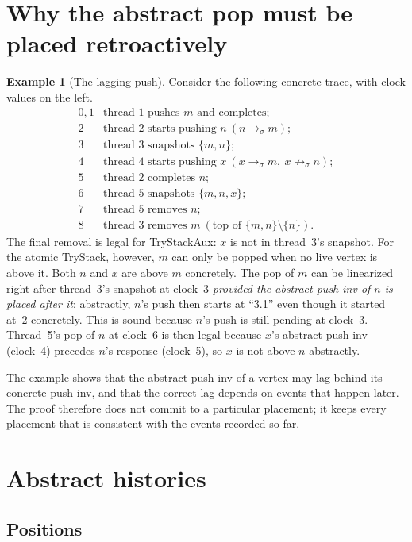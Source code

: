 \documentclass[11pt]{article}
\theoremstyle{definition}
\newtheorem{example}[lemma]{Example}
\theoremstyle{remark}
\newcommand{\conc}{\sigma}
\begin{document}
\section{Why the abstract pop must be placed retroactively}

\begin{example}[The lagging push]\label{ex:f1}
Consider the following concrete trace, with clock values on the left.
\[
\begin{array}{cl}
0,1 & \text{thread 1 pushes } m \text{ and completes};\\
2 & \text{thread 2 starts pushing } n\ (n\to_\conc m);\\
3 & \text{thread 3 snapshots } \{m,n\};\\
4 & \text{thread 4 starts pushing } x\ (x\to_\conc m,\ x\not\to_\conc n);\\
5 & \text{thread 2 completes } n;\\
6 & \text{thread 5 snapshots } \{m,n,x\};\\
7 & \text{thread 5 removes } n;\\
8 & \text{thread 3 removes } m\ (\text{top of }\{m,n\}\setminus\{n\}).
\end{array}
\]
The final removal is legal for TryStackAux: \(x\) is not in thread~3's
snapshot.  For the atomic TryStack, however, \(m\) can only be popped when
no live vertex is above it.  Both \(n\) and \(x\) are above \(m\)
concretely.  The pop of \(m\) can be linearized right after thread~3's
snapshot at clock~3 \emph{provided the abstract push-inv of \(n\) is placed
after it}: abstractly, \(n\)'s push then starts at ``3.1'' even though it
started at~2 concretely.  This is sound because \(n\)'s push is still pending
at clock~3.  Thread~5's pop of \(n\) at clock~6 is then legal because
\(x\)'s abstract push-inv (clock~4) precedes \(n\)'s response (clock~5), so
\(x\) is not above \(n\) abstractly.
\end{example}

The example shows that the abstract push-inv of a vertex may lag behind its
concrete push-inv, and that the correct lag depends on events that happen
later.  The proof therefore does not commit to a particular placement; it
keeps every placement that is consistent with the events recorded so far.

\section{Abstract histories}

\subsection{Positions}
\end{document}
